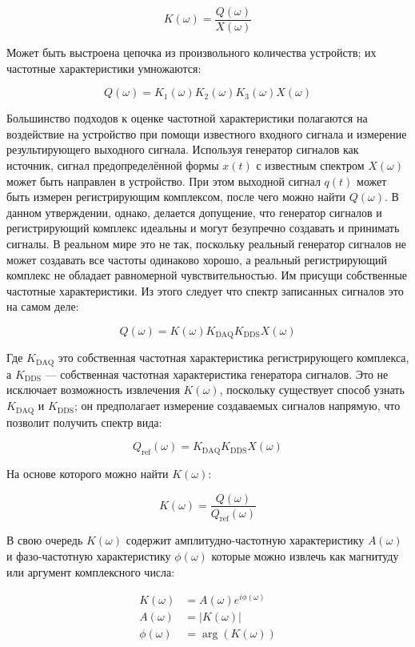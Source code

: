 \documentclass{report}
\begin{document}
$$
K(\omega) = \frac{Q(\omega)}{X(\omega)}
$$

Может быть выстроена цепочка из произвольного количества устройств; их частотные характеристики умножаются:

$$
Q(\omega) = K_1(\omega) K_2(\omega) K_3(\omega) X(\omega)
$$

Большинство подходов к оценке частотной характеристики полагаются на воздействие на устройство при помощи известного входного сигнала и измерение результирующего выходного сигнала. Используя генератор сигналов как источник, сигнал предопределённой формы $x(t)$ с известным спектром $X(\omega)$ может быть направлен в устройство. При этом выходной сигнал $q(t)$ может быть измерен регистрирующим комплексом, после чего можно найти $Q(\omega)$. В данном утверждении, однако, делается допущение, что генератор сигналов и регистрирующий комплекс идеальны и могут безупречно создавать и принимать сигналы. В реальном мире это не так, поскольку реальный генератор сигналов не может создавать все частоты одинаково хорошо, а реальный регистрирующий комплекс не обладает равномерной чувствительностью. Им присущи собственные частотные характеристики. Из этого следует что спектр записанных сигналов это на самом деле:

$$
Q(\omega) = K(\omega) K_\text{DAQ} K_\text{DDS} X(\omega)
$$

Где $K_\text{DAQ}$ это собственная частотная характеристика регистрирующего комплекса, а $K_\text{DDS}$ --- собственная частотная характеристика генератора сигналов. Это не исключает возможность извлечения $K(\omega)$, поскольку существует способ узнать $K_\text{DAQ}$ и $K_\text{DDS}$; он предполагает измерение создаваемых сигналов напрямую, что позволит получить спектр вида:

$$
Q_\text{ref}(\omega) = K_\text{DAQ} K_\text{DDS} X(\omega)
$$

На основе которого можно найти $K(\omega)$:

\begin{equation}
K(\omega) = \frac{Q(\omega)}{Q_\text{ref}(\omega)}
\end{equation}

В свою очередь $K(\omega)$ содержит амплитудно-частотную характеристику $A(\omega)$ и фазо-частотную характеристику $\phi(\omega)$ которые можно извлечь как магнитуду или аргумент комплексного числа:

\begin{align}
K(\omega) &= A(\omega) e^{i \phi(\omega) } \\
A(\omega) &= \left|K(\omega)\right| \\
\phi(\omega) &= \arg\left(K\left(\omega\right)\right)
\end{align}
\end{document}
